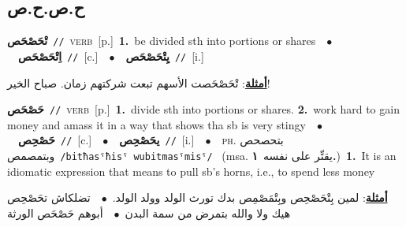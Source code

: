 \documentclass[10pt,a4paper,twoside]{article} %
\begin{document}
\begin{multicols}{2}
\vspace{-3mm}
\subsection*{\color{blue}\foreignlanguage{arabic}{ح.ص.ح.ص}\color{blue}{}} 

{\setlength\topsep{0pt}\textbf{\foreignlanguage{arabic}{تْحَصْحَص}}\ {\color{gray}\texttt{//}\color{black}}\ \textsc{verb}\ [p.]\ \textbf{1.}~be divided sth into portions or shares\ \ $\bullet$\ \ \setlength\topsep{0pt}\textbf{\foreignlanguage{arabic}{اِتْحَصْحَص}}\ {\color{gray}\texttt{//}\color{black}}\ [c.]\ \ $\bullet$\ \ \setlength\topsep{0pt}\textbf{\foreignlanguage{arabic}{يِتْحَصْحَص}}\ {\color{gray}\texttt{//}\color{black}}\ [i.]\  \begin{flushright}\color{gray}\foreignlanguage{arabic}{\textbf{\underline{\foreignlanguage{arabic}{أمثلة}}}: تْحَصْحَصت الأسهم تبعت شركتهم زمان. صباح الخير!}\end{flushright}\color{black}} \vspace{2mm}

{\setlength\topsep{0pt}\textbf{\foreignlanguage{arabic}{حَصْحَص}}\ {\color{gray}\texttt{//}\color{black}}\ \textsc{verb}\ [p.]\ \textbf{1.}~divide sth into portions or shares.  \textbf{2.}~work hard to gain money and amass it in a way that shows tha sb is very stingy\ \ $\bullet$\ \ \setlength\topsep{0pt}\textbf{\foreignlanguage{arabic}{حَصْحِص}}\ {\color{gray}\texttt{//}\color{black}}\ [c.]\ \ $\bullet$\ \ \setlength\topsep{0pt}\textbf{\foreignlanguage{arabic}{يحَصْحِص}}\ {\color{gray}\texttt{//}\color{black}}\ [i.]\ \ $\bullet$\ \ \textsc{ph.} \color{gray} \foreignlanguage{arabic}{بتحصحص وبتمصمص}\color{black}\ {\color{gray}\texttt{/{\sffamily bitħasˤħisˤ wubitmasˤmisˤ}/}\color{black}}\ \color{gray} (msa. \foreignlanguage{arabic}{يقتِّر على نفسه}~\foreignlanguage{arabic}{\textbf{١.}})\color{black}\ \textbf{1.}~It is an idiomatic expression that means to pull sb's horns, i.e., to spend less money\  \begin{flushright}\color{gray}\foreignlanguage{arabic}{\textbf{\underline{\foreignlanguage{arabic}{أمثلة}}}: لمين بِتْحَصْحِص وبِتْمَصْمِص بدك تورث الولد وولد الولد.\ $\bullet$\ \  تضلكاش تحَصْحِص هيك ولا والله بتمرض من سمة البدن\ $\bullet$\ \  أبوهم حَصْحَص الورثة}\end{flushright}\color{black}} \vspace{2mm}


\end{multicols}
\end{document}
